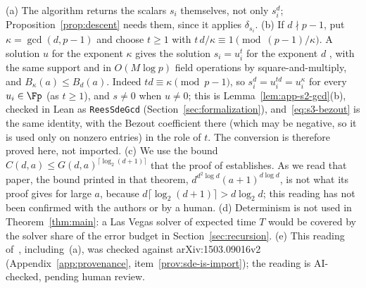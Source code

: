 \begin{remark}
\label{rem:is-import}
\textup{(a)} The algorithm returns the scalars $s_i$ themselves, not only $s_i^d$; Proposition~\ref{prop:descent} needs them, since it applies $\delta_{s_i}$.
\textup{(b)} If $d \nmid p-1$, put $\kappa = \gcd(d,p-1)$ and choose $t \ge 1$ with $t\,d/\kappa \equiv 1 \pmod{(p-1)/\kappa}$. A solution $u$ for the exponent $\kappa$ gives the solution $s_i = u_i^{t}$ for the exponent $d$ \cite[Section~3]{IvanyosSantha2015}, with the same support and in $O(M\log p)$ field operations by square-and-multiply, and $B_\kappa(a) \le B_d(a)$. Indeed $td \equiv \kappa \pmod{p-1}$, so $s_i^d = u_i^{td} = u_i^{\kappa}$ for every $u_i \in \Fp$ (as $t \ge 1$), and $s \ne 0$ when $u \ne 0$; this is Lemma~\ref{lem:app-s2-gcd}(b), checked in Lean as \texttt{ReesSdeGcd} (Section~\ref{sec:formalization}), and~\eqref{eq:s3-bezout} is the same identity, with the Bezout coefficient there (which may be negative, so it is used only on nonzero entries) in the role of $t$. The conversion is therefore proved here, not imported.
\textup{(c)} We use the bound $C(d,a) \le G(d,a)^{\lceil\log_2(d+1)\rceil}$ that the proof of \cite[Theorem~3]{IvanyosSantha2015} establishes. As we read that paper, the bound printed in that theorem, $d^{d^2\log d}(a+1)^{d\log d}$, is not what its proof gives for large $a$, because $d\lceil\log_2(d+1)\rceil > d\log_2 d$; this reading has not been confirmed with the authors or by a human.
\textup{(d)} Determinism is not used in Theorem~\ref{thm:main}: a Las Vegas solver of expected time $T$ would be covered by the solver share of the error budget in Section~\ref{sec:recursion}.
\textup{(e)} This reading of~\cite{IvanyosSantha2015}, including~(a), was checked against arXiv:1503.09016v2 (Appendix~\ref{app:provenance}, item~\ref{prov:sde-is-import}); the reading is AI-checked, pending human review.
\end{remark}

